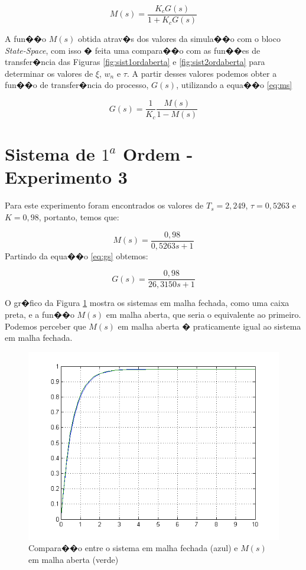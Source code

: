 \documentclass[11pt,a4paper]{report}
\begin{document}
		\begin{equation}\label{eq:ms}
			M(s) = \frac{K_{c}G(s)}{1+K_{c}G(s)}
		\end{equation}			
				
A fun��o $M(s)$ obtida atrav�s dos valores da simula��o com o bloco \textit{State-Space}, com isso � feita uma compara��o com as fun��es de transfer�ncia das Figuras \ref{fig:sist1ordaberta} e \ref{fig:sist2ordaberta} para determinar os valores de $\xi$, $w_{n}$ e $\tau$. A partir desses valores podemos obter a fun��o de transfer�ncia do processo, $G(s)$, utilizando a equa��o \ref{eq:ms}
			
		\begin{equation}\label{eq:gs}
			G(s) = \frac{1}{K_{c}}\frac{M(s)}{1-M(s)}
		\end{equation}						

\section{Sistema de $1^{a}$ Ordem - Experimento 3}

Para este experimento foram encontrados os valores de $T_{s} = 2,249$, $\tau = 0,5263$ e $K = 0,98$, portanto, temos que:

		\[ M(s) = \frac{0,98}{0,5263s+1}\]
		Partindo da equa��o \ref{eq:gs} obtemos:
		
		\[ G(s) = \frac{0,98}{26,3150s+1}\]	
		
		O gr�fico da Figura \ref{fig:sist1ordemindiretacomparacao} mostra os sistemas em malha fechada, como uma caixa preta, e a fun��o $M(s)$ em malha aberta, que seria o equivalente ao primeiro. Podemos perceber que $M(s)$ em malha aberta � praticamente igual ao sistema em malha fechada.	
		
		\begin{figure}[h]
			\centering
			\includegraphics[scale=0.75]{./pictures/1ordem_indireta_comparacao.png}
			\caption{Compara��o entre o sistema em malha fechada (azul) e $M(s)$ em malha aberta (verde)}
			\label{fig:sist1ordemindiretacomparacao}			
		\end{figure}
	
\end{document}

